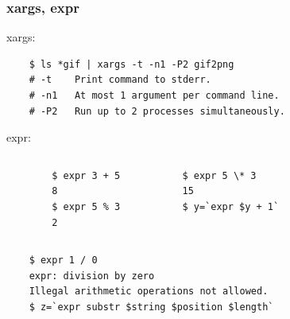 \documentclass[hyperref={unicode=true}]{beamer}
\begin{document}
\begin{frame}[fragile]
    \frametitle{xargs, expr}
    xargs:
	\begin{addmargin}[1em]{0em}
	\begin{verbatim}
    $ ls *gif | xargs -t -n1 -P2 gif2png
    # -t    Print command to stderr.
    # -n1   At most 1 argument per command line.
    # -P2   Run up to 2 processes simultaneously.
	\end{verbatim}
	\end{addmargin}
    expr:
    \begin{columns}[T]
        \begin{verbatim}
        $ expr 3 + 5
        8
        $ expr 5 % 3
        2
        \end{verbatim}

        \begin{verbatim}
        $ expr 5 \* 3
        15
        $ y=`expr $y + 1`
        \end{verbatim}
	\end{columns}

    \vspace{.5em}
    \begin{addmargin}[1em]{0em}
    \begin{verbatim}
    $ expr 1 / 0
    expr: division by zero
    Illegal arithmetic operations not allowed.
    $ z=`expr substr $string $position $length`
	\end{verbatim}
	\end{addmargin}
\end{frame}
\end{document}
